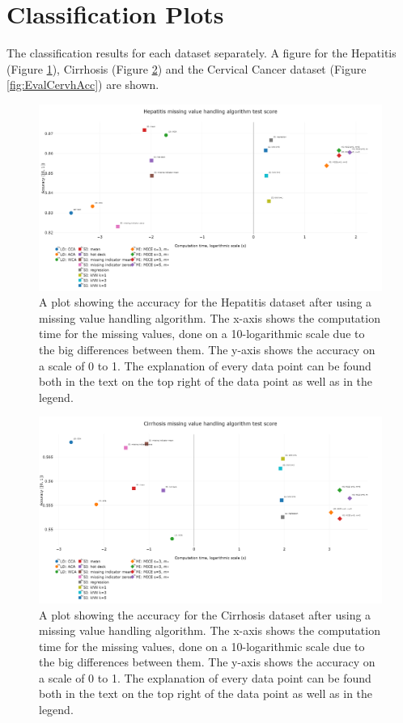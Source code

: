 \documentclass[10pt,a4paper]{article}
\begin{document}
\section{Classification Plots}
\label{app:ClassPlots}

The classification results for each dataset separately. A figure for the Hepatitis (Figure \ref{fig:EvalHepaAcc}), Cirrhosis (Figure \ref{fig:EvalCirrhAcc}) and the Cervical Cancer dataset (Figure \ref{fig:EvalCervhAcc}) are shown.

	\begin{figure}[H]
		\centering
		\includegraphics[angle=90,height=0.9\textheight]{hepa_acc.PNG}
		\caption{A plot showing the accuracy for the Hepatitis dataset after using a missing value handling algorithm. The x-axis shows the computation time for the missing values, done on a 10-logarithmic scale due to the big differences between them. The y-axis shows the accuracy on a scale of 0 to 1. The explanation of every data point can be found both in the text on the top right of the data point as well as in the legend.}
		\label{fig:EvalHepaAcc}
	\end{figure}

	\begin{figure}[H]
	\centering
	\includegraphics[angle=90,height=0.9\textheight]{cirrh_acc.PNG}
	\caption{A plot showing the accuracy for the Cirrhosis dataset after using a missing value handling algorithm. The x-axis shows the computation time for the missing values, done on a 10-logarithmic scale due to the big differences between them. The y-axis shows the accuracy on a scale of 0 to 1. The explanation of every data point can be found both in the text on the top right of the data point as well as in the legend.}
	\label{fig:EvalCirrhAcc}
\end{figure}
\end{document}
